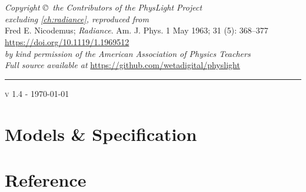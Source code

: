 \documentclass{physlight}
\def\physLightVersion{v 1.4 - \today}
\begin{document}

\begin{titlepage}
\begin{center}

{\fontsize{60}{72}\selectfont \physLight}\\[.3cm]

{}\\[1.5cm]

\vfill
\textit{Copyright \copyright\ the Contributors of the PhysLight Project}\\[1mm]
\textit{excluding \cref{ch:radiance}, reproduced from }\\
Fred E. Nicodemus; \textit{Radiance}. Am. J. Phys. 1 May 1963; 31 (5): 368--377\\
\url{https://doi.org/10.1119/1.1969512}\\
\textit{by kind permission of the American Association of Physics Teachers}\\[1mm]
\textit{Full source available at} \url{https://github.com/wetadigital/physlight}\\[1mm]

\hrule \vspace{1mm}
\textsc{\large \physLightVersion}\\[0.5cm]

\end{center}
\end{titlepage}

\tableofcontents
\listoffigures
\listoftables



\part{Models \& Specification}\label{part:models}






\part{Reference}\label{part:ref}



\end{document}
